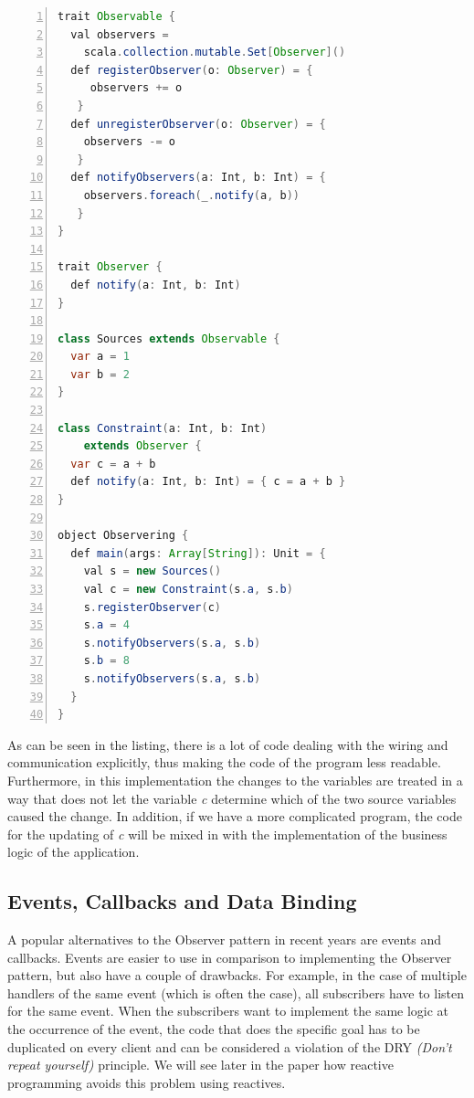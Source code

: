 \documentclass{sigplanconf}
\begin{document}
\begin{lstlisting}[frame=single,caption=Observer Pattern in Scala, captionpos=b,linewidth=\columnwidth, language=java, basicstyle=\small, morekeywords={def,val,var,object, trait}, keywordstyle=\color{blue},
numbers=left, numbersep=5pt] 
trait Observable {
  val observers = 
    scala.collection.mutable.Set[Observer]()
  def registerObserver(o: Observer) = {
	 observers += o 
   }
  def unregisterObserver(o: Observer) = { 
	observers -= o 
   }
  def notifyObservers(a: Int, b: Int) = {
	observers.foreach(_.notify(a, b)) 
   }
}

trait Observer {
  def notify(a: Int, b: Int)
}

class Sources extends Observable {
  var a = 1
  var b = 2
}

class Constraint(a: Int, b: Int) 
	extends Observer {
  var c = a + b
  def notify(a: Int, b: Int) = { c = a + b }
}

object Observering {
  def main(args: Array[String]): Unit = {
    val s = new Sources()
    val c = new Constraint(s.a, s.b)
    s.registerObserver(c)
    s.a = 4
    s.notifyObservers(s.a, s.b)
    s.b = 8
    s.notifyObservers(s.a, s.b)
  }
}

\end{lstlisting}

As can be seen in the listing, there is a lot of code dealing with the wiring and communication explicitly, thus making the code of the program less readable. Furthermore, in this implementation the changes to the variables are treated in a way that does not let the variable \textit{c} determine which of the two source variables caused the change. In addition, if we have a more complicated program, the code for the updating of \textit{c} will be mixed in with the implementation of the business logic of the application. 

\subsection{Events, Callbacks and Data Binding}

A popular alternatives to the Observer pattern in recent years are events and callbacks. 
Events are easier to use in comparison to implementing the Observer pattern, but also have a couple of drawbacks. For example, in the case of multiple handlers of the same event (which is often the case), all subscribers have to listen for the same event. When the subscribers want to implement the same logic at the occurrence of the event, the code that does the specific goal has to be duplicated on every client and can be considered a violation of the DRY \textit{(Don't repeat yourself)} principle. We will see later in the paper how reactive programming avoids this problem using reactives.
\end{document}
